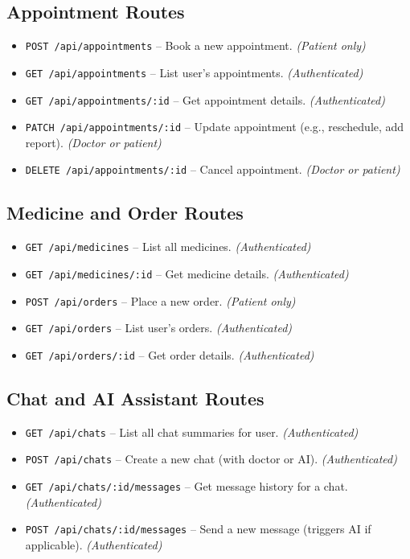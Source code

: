 \documentclass[12pt]{article}
\begin{document}
\subsection{Appointment Routes}
\begin{itemize}[leftmargin=1cm]
    \item \texttt{POST /api/appointments} -- Book a new appointment. \textit{(Patient only)}
    \item \texttt{GET /api/appointments} -- List user's appointments. \textit{(Authenticated)}
    \item \texttt{GET /api/appointments/:id} -- Get appointment details. \textit{(Authenticated)}
    \item \texttt{PATCH /api/appointments/:id} -- Update appointment (e.g., reschedule, add report). \textit{(Doctor or patient)}
    \item \texttt{DELETE /api/appointments/:id} -- Cancel appointment. \textit{(Doctor or patient)}
\end{itemize}

\subsection{Medicine and Order Routes}
\begin{itemize}[leftmargin=1cm]
    \item \texttt{GET /api/medicines} -- List all medicines. \textit{(Authenticated)}
    \item \texttt{GET /api/medicines/:id} -- Get medicine details. \textit{(Authenticated)}
    \item \texttt{POST /api/orders} -- Place a new order. \textit{(Patient only)}
    \item \texttt{GET /api/orders} -- List user's orders. \textit{(Authenticated)}
    \item \texttt{GET /api/orders/:id} -- Get order details. \textit{(Authenticated)}
\end{itemize}

\subsection{Chat and AI Assistant Routes}
\begin{itemize}[leftmargin=1cm]
    \item \texttt{GET /api/chats} -- List all chat summaries for user. \textit{(Authenticated)}
    \item \texttt{POST /api/chats} -- Create a new chat (with doctor or AI). \textit{(Authenticated)}
    \item \texttt{GET /api/chats/:id/messages} -- Get message history for a chat. \textit{(Authenticated)}
    \item \texttt{POST /api/chats/:id/messages} -- Send a new message (triggers AI if applicable). \textit{(Authenticated)}
\end{itemize}
\end{document}
